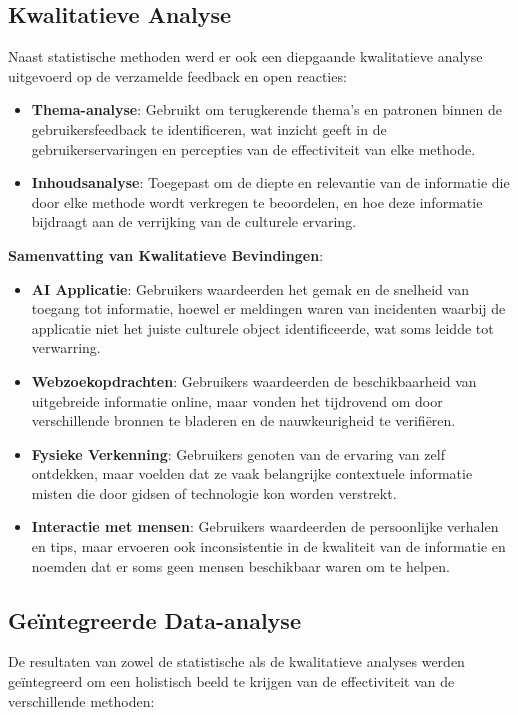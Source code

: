 \subsection{Kwalitatieve Analyse}
Naast statistische methoden werd er ook een diepgaande kwalitatieve analyse uitgevoerd op de verzamelde feedback en open reacties:

\begin{itemize}
    \item \textbf{Thema-analyse}: Gebruikt om terugkerende thema’s en patronen binnen de gebruikersfeedback te identificeren, wat inzicht geeft in de gebruikerservaringen en percepties van de effectiviteit van elke methode.
    \item \textbf{Inhoudsanalyse}: Toegepast om de diepte en relevantie van de informatie die door elke methode wordt verkregen te beoordelen, en hoe deze informatie bijdraagt aan de verrijking van de culturele ervaring.
\end{itemize}

\textbf{Samenvatting van Kwalitatieve Bevindingen}:

\begin{itemize}
    \item \textbf{AI Applicatie}: Gebruikers waardeerden het gemak en de snelheid van toegang tot informatie, hoewel er meldingen waren van incidenten waarbij de applicatie niet het juiste culturele object identificeerde, wat soms leidde tot verwarring.
    \item \textbf{Webzoekopdrachten}: Gebruikers waardeerden de beschikbaarheid van uitgebreide informatie online, maar vonden het tijdrovend om door verschillende bronnen te bladeren en de nauwkeurigheid te verifiëren.
    \item \textbf{Fysieke Verkenning}: Gebruikers genoten van de ervaring van zelf ontdekken, maar voelden dat ze vaak belangrijke contextuele informatie misten die door gidsen of technologie kon worden verstrekt.
    \item \textbf{Interactie met mensen}: Gebruikers waardeerden de persoonlijke verhalen en tips, maar ervoeren ook inconsistentie in de kwaliteit van de informatie en noemden dat er soms geen mensen beschikbaar waren om te helpen.
\end{itemize}

\subsection{Geïntegreerde Data-analyse}
De resultaten van zowel de statistische als de kwalitatieve analyses werden geïntegreerd om een holistisch beeld te krijgen van de effectiviteit van de verschillende methoden:

